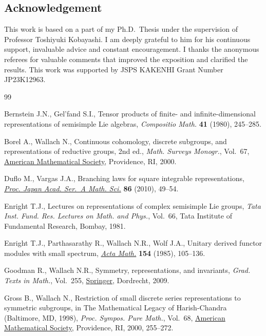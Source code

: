 \documentclass[10pt,a4paper]{amsart}
\numberwithin{equation}{section}
\theoremstyle{definition}
\begin{document}
\subsection*{Acknowledgement}

This work is based on a part of my Ph.D.\ Thesis under the supervision of Professor Toshiyuki Kobayashi.
I am deeply grateful to him for his continuous support, invaluable advice and constant encouragement.
I thanks the anonymous referees for valuable comments that improved the exposition and clarified the results.
This work was supported by JSPS KAKENHI Grant Number JP23K12963.


\begin{thebibliography}{99}
\footnotesize\itemsep=0pt

Bernstein J.N., Gel'fand S.I., Tensor products of finite- and
 infinite-dimensional representations of semisimple {L}ie algebras,
 \textit{Compositio Math.} \textbf{41} (1980), 245--285.

Borel A., Wallach N., Continuous cohomology, discrete subgroups, and
 representations of reductive groups, 2nd ed., \textit{Math. Surveys Monogr.}, Vol.~67, \href{https://doi.org/10.1090/surv/067}{American Mathematical Society}, Providence, RI, 2000.

Duflo M., Vargas J.A., Branching laws for square integrable representations,
 \href{https://doi.org/10.3792/pjaa.86.49}{\textit{Proc. Japan Acad. Ser.~A
 Math. Sci.}} \textbf{86} (2010), 49--54.

Enright T.J., Lectures on representations of complex semisimple {L}ie groups,
 \textit{Tata Inst. Fund. Res. Lectures on Math. and Phys.}, Vol.~66, Tata
 Institute of Fundamental Research, Bombay, 1981.

Enright T.J., Parthasarathy R., Wallach N.R., Wolf J.A., Unitary derived
 functor modules with small spectrum,
 \href{https://doi.org/10.1007/BF02392820}{\textit{Acta Math.}} \textbf{154}
 (1985), 105--136.

Goodman R., Wallach N.R., Symmetry, representations, and invariants,
 \textit{Grad. Texts in Math.}, Vol.~255,
 \href{https://doi.org/10.1007/978-0-387-79852-3}{Springer}, Dordrecht, 2009.

Gross B., Wallach N., Restriction of small discrete series representations to
 symmetric subgroups, in The Mathematical Legacy of {H}arish-{C}handra
 ({B}altimore, {MD}, 1998), \textit{Proc. Sympos. Pure Math.}, Vol.~68,
 \href{https://doi.org/10.1090/pspum/068/1767899}{American Mathematical
 Society}, Providence, RI, 2000, 255--272.


\end{thebibliography}
\end{document}
